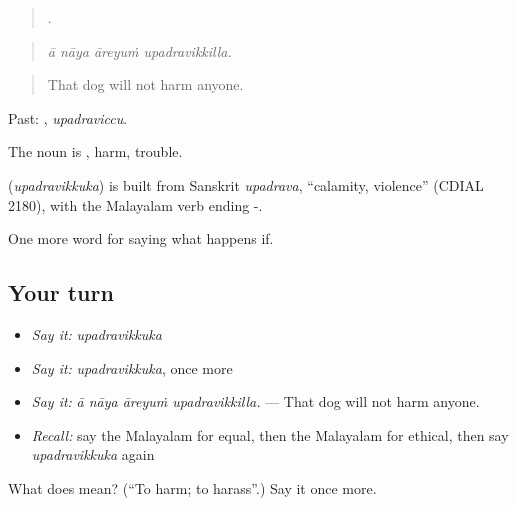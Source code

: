 \begin{quote}
   .
\end{quote}

\begin{quote}
\emph{ā nāya āreyuṁ upadravikkilla.}
\end{quote}

\begin{quote}
That dog will not harm anyone.
\end{quote}

Past: , \emph{upadraviccu}.

The noun is , harm, trouble.

\begin{cousinweb}
\textbf{} (\emph{upadravikkuka}) is built from Sanskrit \emph{upadrava}, \textquotedblleft{}calamity, violence\textquotedblright{} (CDIAL 2180), with the Malayalam verb ending -.
\end{cousinweb}

\begin{grammarlens}[title={What you've built}]
One more word for saying what happens if.
\end{grammarlens}

\subsection*{Your turn}
\begin{itemize}
\raggedright
  \item \emph{Say it:} \emph{upadravikkuka}
  \item \emph{Say it:} \emph{upadravikkuka}, once more
  \item \emph{Say it:} \emph{ā nāya āreyuṁ upadravikkilla.} — That dog will not harm anyone.
  \item \emph{Recall:} say the Malayalam for equal, then the Malayalam for ethical, then say \emph{upadravikkuka} again
\end{itemize}

\begin{tcolorbox}[breakable,colback=teal!4,colframe=teal!35!black,title={Before you move on}]
What does  mean? (\textquotedblleft{}To harm; to harass\textquotedblright{}.) Say it once more.
\end{tcolorbox}
